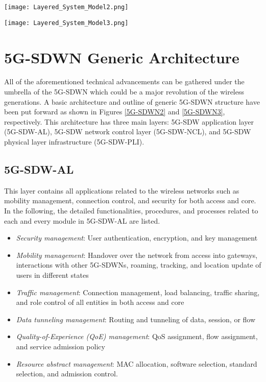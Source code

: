 \documentclass[conference]{IEEEtran}
\begin{document}
\begin{figure*}[!t]
	\centering
	\texttt{[image: Layered\_System\_Model2.png]}
	\caption{Illustration of 5G-SDWN generic architecture}
\label{5G-SDWN2}
\end{figure*}


\begin{figure*}[!t]
	\centering
	\texttt{[image: Layered\_System\_Model3.png]}
	\caption{5G-SDWN generic Outline based on proposed architecture}
	\label{5G-SDWN3}
\end{figure*}




\section{5G-SDWN Generic Architecture }

All of the aforementioned technical advancements can be gathered under the umbrella of the 5G-SDWN which could be a major revolution of the wireless generations. A basic architecture and outline of generic 5G-SDWN structure have been put forward as shown in Figures \ref{5G-SDWN2} and \ref{5G-SDWN3}, respectively. This architecture has three main layers: 5G-SDW application layer (5G-SDW-AL), 5G-SDW network control layer (5G-SDW-NCL), and 5G-SDW physical layer infrastructure (5G-SDW-PLI).

\subsection {5G-SDW-AL} This layer contains all applications related to the wireless networks such as mobility management, connection control, and security for both access and core. In the following, the detailed functionalities, procedures, and processes related to each and every module in 5G-SDW-AL are listed.
\begin{itemize}
	\item \textit{Security management}: User authentication, encryption, and key management
	\item \textit{Mobility management}: Handover over the network from access into gateways, interactions with other 5G-SDWNs, roaming, tracking, and location update of users in different states
	\item \textit{Traffic management}: Connection management, load balancing, traffic sharing, and role control of all entities in both access and core
	\item \textit{Data tunneling management}: Routing and tunneling of data, session, or flow
	\item \textit{Quality-of-Experience (QoE) management}: QoS assignment, flow assignment, and service admission policy
	\item \textit{Resource abstract management}: MAC allocation, software selection, standard selection, and admission control.
	
\end{itemize}	
  
\end{document}
